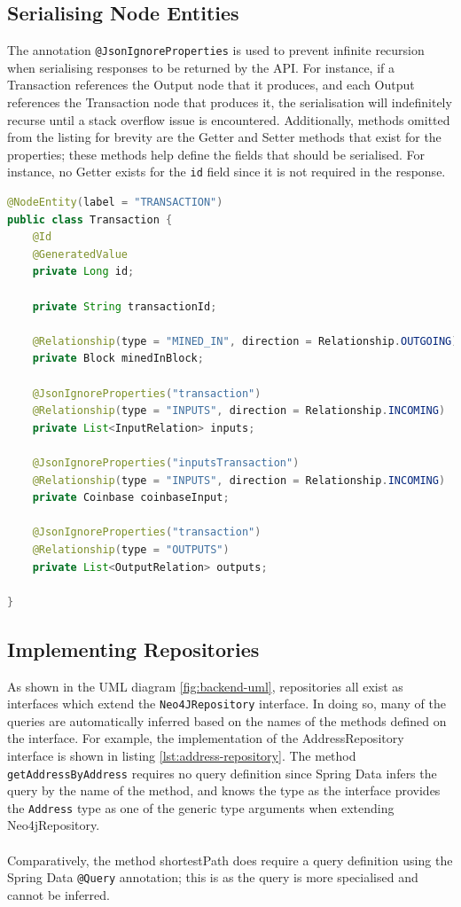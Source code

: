 \subsection{Serialising Node Entities}
The annotation \texttt{@JsonIgnoreProperties} is used to prevent infinite recursion when serialising responses to be returned by the API. For instance, if a Transaction references the Output node that it produces, and each Output references the Transaction node that produces it, the serialisation will indefinitely recurse until a stack overflow issue is encountered. Additionally, methods omitted from the listing for brevity are the Getter and Setter methods that exist for the properties; these methods help define the fields that should be serialised. For instance, no Getter exists for the \texttt{id} field since it is not required in the response. 

\begin{lstlisting}[language=Java, label={lst:node-entity-transaction}, caption={A transaction node entity}, breaklines=true, basicstyle=\small]
@NodeEntity(label = "TRANSACTION")
public class Transaction {
    @Id
    @GeneratedValue
    private Long id;

    private String transactionId;

    @Relationship(type = "MINED_IN", direction = Relationship.OUTGOING)
    private Block minedInBlock;

    @JsonIgnoreProperties("transaction")
    @Relationship(type = "INPUTS", direction = Relationship.INCOMING)
    private List<InputRelation> inputs;

    @JsonIgnoreProperties("inputsTransaction")
    @Relationship(type = "INPUTS", direction = Relationship.INCOMING)
    private Coinbase coinbaseInput;

    @JsonIgnoreProperties("transaction")
    @Relationship(type = "OUTPUTS")
    private List<OutputRelation> outputs;

}
\end{lstlisting}

\subsection{Implementing Repositories}
As shown in the UML diagram \ref{fig:backend-uml}, repositories all exist as interfaces which extend the \texttt{Neo4JRepository} interface. In doing so, many of the queries are automatically inferred based on the names of the methods defined on the interface. For example, the implementation of the AddressRepository interface is shown in listing \ref{lst:address-repository}. The method \texttt{getAddressByAddress} requires no query definition since Spring Data infers the query by the name of the method, and knows the type as the interface provides the \texttt{Address} type as one of the generic type arguments when extending Neo4jRepository. 
\\\\
Comparatively, the method shortestPath does require a query definition using the Spring Data \texttt{@Query} annotation; this is as the query is more specialised and cannot be inferred.

